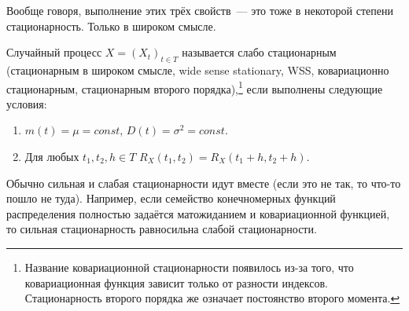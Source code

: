Вообще говоря, выполнение этих трёх свойств~--- это тоже в некоторой степени 
стационарность. Только в широком смысле.
\begin{definition}
	Случайный процесс \(X = (X_{t})_{t \in T}\) называется слабо стационарным 
	(стационарным в широком смысле, wide sense stationary, WSS, ковариационно 
	стационарным, стационарным второго порядка),\footnote{Название 
	ковариационной стационарности появилось из-за того, что ковариационная 
	функция зависит только от разности индексов. Стационарность второго порядка 
	же означает постоянство второго момента.} если выполнены следующие
	условия:
	\begin{enumerate}
		\item \(m(t) = \mu = const\), \(D(t) = \sigma^{2} = const\).
		\item Для любых \(t_{1}, t_{2}, h \in T\) \(R_{X}(t_{1}, t_{2}) = 
		R_{X}(t_{1} + h, t_{2} + h)\).
	\end{enumerate}
\end{definition}

Обычно сильная и слабая стационарности идут вместе (если это не так, то что-то 
пошло не туда). Например, если семейство конечномерных функций распределения 
полностью задаётся матожиданием и ковариационной функцией, то сильная 
стационарность равносильна слабой стационарности.

